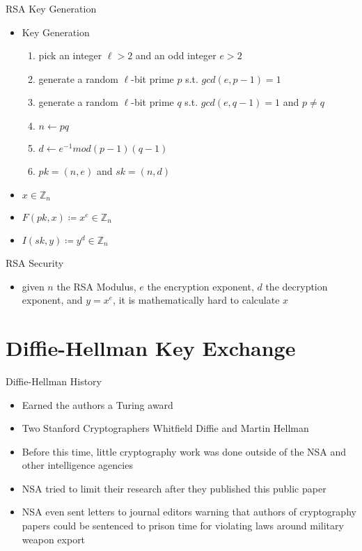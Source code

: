 \documentclass[handout]{beamer}
\begin{document}
\begin{frame}{RSA Key Generation}
    \begin{itemize}
        \item Key Generation
        \begin{enumerate}
            \item \pause pick an integer \(\ell > 2\) and an odd integer \(e > 2\) 
            \item \pause generate a random \(\ell\)-bit prime \(p\) s.t. \(gcd(e, p-1) = 1\)
            \item \pause generate a random \(\ell\)-bit prime \(q\) s.t. \(gcd(e, q-1) = 1\) and \(p \neq q\)
            \item \pause \(n \leftarrow pq\)
            \item \pause \(d \leftarrow e^{-1}mod (p-1)(q-1) \)
            \item \pause \(pk = (n, e)\) and \(sk = (n, d)\)
        \end{enumerate}
        \item \pause \(x \in \mathbb{Z}_n\)
        \item \pause \(F(pk, x) \coloneqq x^e \in \mathbb{Z}_n\) 
        \item \pause \(I(sk, y) \coloneqq y^d \in \mathbb{Z}_n\) 
    \end{itemize}
\end{frame}

\begin{frame}{RSA Security}
    \begin{itemize}
        \item \pause given \(n\) the RSA Modulus, \(e\) the encryption exponent, \(d\) the decryption exponent, and \(y = x^e\), it is mathematically hard to calculate \(x\)
    \end{itemize}
\end{frame}

\section{Diffie-Hellman Key Exchange}

\begin{frame}{Diffie-Hellman History}
    \begin{itemize}
        \item \pause Earned the authors a Turing award
        \item \pause Two Stanford Cryptographers Whitfield Diffie and Martin Hellman
        \item \pause Before this time, little cryptography work was done outside of the NSA and other intelligence agencies
        \item \pause NSA tried to limit their research after they published this public paper
        \item \pause NSA even sent letters to journal editors warning that authors of cryptography papers could be sentenced to prison time for violating laws around military weapon export
    \end{itemize}
\end{frame}
\end{document}
